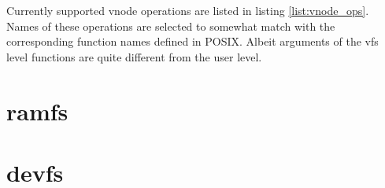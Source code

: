 Currently supported vnode operations are listed in listing \ref{list:vnode_ops}.
Names of these operations are selected to somewhat match with the corresponding
function names defined in \acs{POSIX}. Albeit arguments of the \acs{vfs} level
functions are quite different from the user level.



\chapter{ramfs}


\chapter{devfs}

